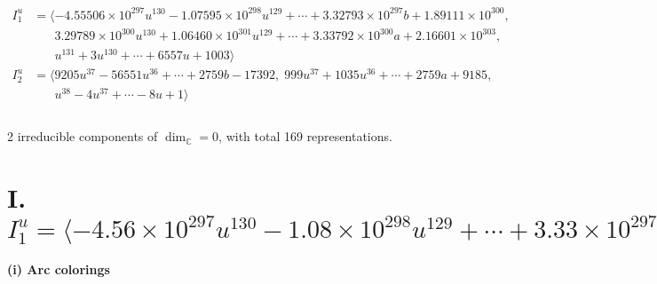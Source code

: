 \documentclass[1p]{elsarticle_modified}
\theoremstyle{definition}
\begin{document}
\begin{align*}
I^u_{1}&=\langle 
-4.55506\times10^{297} u^{130}-1.07595\times10^{298} u^{129}+\cdots+3.32793\times10^{297} b+1.89111\times10^{300},\\
\phantom{I^u_{1}}&\phantom{= \langle  }3.29789\times10^{300} u^{130}+1.06460\times10^{301} u^{129}+\cdots+3.33792\times10^{300} a+2.16601\times10^{303},\\
\phantom{I^u_{1}}&\phantom{= \langle  }u^{131}+3 u^{130}+\cdots+6557 u+1003\rangle \\
I^u_{2}&=\langle 
9205 u^{37}-56551 u^{36}+\cdots+2759 b-17392,\;999 u^{37}+1035 u^{36}+\cdots+2759 a+9185,\\
\phantom{I^u_{2}}&\phantom{= \langle  }u^{38}-4 u^{37}+\cdots-8 u+1\rangle \\
\\
\end{align*}
\raggedright * 2 irreducible components of $\dim_{\mathbb{C}}=0$, with total 169 representations.\\
\newpage
\renewcommand{\arraystretch}{1}
\centering \section*{I. $I^u_{1}= \langle -4.56\times10^{297} u^{130}-1.08\times10^{298} u^{129}+\cdots+3.33\times10^{297} b+1.89\times10^{300},\;3.30\times10^{300} u^{130}+1.06\times10^{301} u^{129}+\cdots+3.34\times10^{300} a+2.17\times10^{303},\;u^{131}+3 u^{130}+\cdots+6557 u+1003 \rangle$}
\flushleft \textbf{(i) Arc colorings}\\
\end{document}
